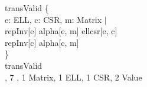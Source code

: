 \begin{myquote}
\Bassert transValid \{\\
\TA \Ball e: ELL, c: CSR, m: Matrix $|$\\
\TB repInv[e] \Band alpha[e, m] \Band ellcsr[e, c] \Bimplies\\
\TC repInv[c] \Band alpha[c, m]\\
\}\\
\Bcheck transValid\\
\TA {} \Bint, 7 \Bseq, 1 Matrix, 1 ELL, 1 CSR, 2 Value\\
\end{myquote}